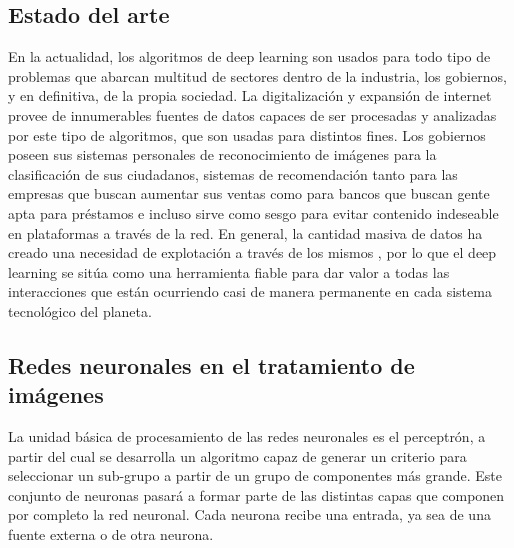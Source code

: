 \subsection{Estado del arte}\label{subsec:estado-del-arte}
En la actualidad, los algoritmos de deep learning son usados para todo tipo de problemas que abarcan multitud de sectores dentro de la industria, los gobiernos, y en definitiva, de la propia sociedad.
La digitalización y expansión de internet provee de innumerables fuentes de datos capaces de ser procesadas y analizadas por este tipo de algoritmos, que son usadas para distintos fines.
Los gobiernos poseen sus sistemas personales de reconocimiento de imágenes para la clasificación de sus ciudadanos, sistemas de recomendación tanto para las empresas que buscan aumentar sus ventas como para bancos que buscan gente apta para préstamos e
incluso sirve como sesgo para evitar contenido indeseable en plataformas a través de la red.
En general, la cantidad masiva de datos ha creado una necesidad de explotación a
través de los mismos , por lo que el deep learning se sitúa como una herramienta fiable para dar valor a todas las interacciones que están ocurriendo casi de manera permanente
en cada sistema tecnológico del planeta.

\subsection{Redes neuronales en el tratamiento de imágenes}\label{subsec:redes-neuronales-en-el-tratamiento-de-imágenes}
La unidad básica de procesamiento de las redes neuronales es el perceptrón, a partir del cual se desarrolla un algoritmo capaz de generar un criterio para seleccionar un sub-grupo a partir de un grupo de componentes más grande.
Este conjunto de neuronas pasará a formar parte de las distintas capas que componen por completo la red neuronal.
Cada neurona recibe una entrada, ya sea de una fuente externa o de otra neurona.

